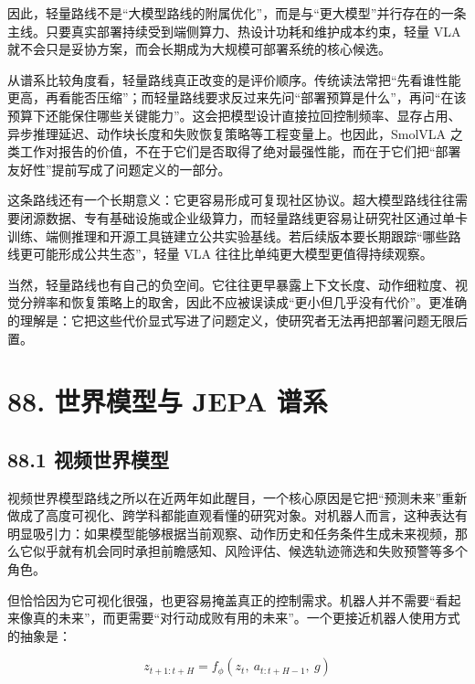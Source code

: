 因此，轻量路线不是“大模型路线的附属优化”，而是与“更大模型”并行存在的一条主线。只要真实部署持续受到端侧算力、热设计功耗和维护成本约束，轻量 VLA 就不会只是妥协方案，而会长期成为大规模可部署系统的核心候选。

从谱系比较角度看，轻量路线真正改变的是评价顺序。传统读法常把“先看谁性能更高，再看能否压缩”；而轻量路线要求反过来先问“部署预算是什么”，再问“在该预算下还能保住哪些关键能力”。这会把模型设计直接拉回控制频率、显存占用、异步推理延迟、动作块长度和失败恢复策略等工程变量上。也因此，SmolVLA 之类工作对报告的价值，不在于它们是否取得了绝对最强性能，而在于它们把“部署友好性”提前写成了问题定义的一部分。

这条路线还有一个长期意义：它更容易形成可复现社区协议。超大模型路线往往需要闭源数据、专有基础设施或企业级算力，而轻量路线更容易让研究社区通过单卡训练、端侧推理和开源工具链建立公共实验基线。若后续版本要长期跟踪“哪些路线更可能形成公共生态”，轻量 VLA 往往比单纯更大模型更值得持续观察。

当然，轻量路线也有自己的负空间。它往往更早暴露上下文长度、动作细粒度、视觉分辨率和恢复策略上的取舍，因此不应被误读成“更小但几乎没有代价”。更准确的理解是：它把这些代价显式写进了问题定义，使研究者无法再把部署问题无限后置。

\section*{88. 世界模型与 JEPA 谱系}

\subsection*{88.1 视频世界模型}


视频世界模型路线之所以在近两年如此醒目，一个核心原因是它把“预测未来”重新做成了高度可视化、跨学科都能直观看懂的研究对象。对机器人而言，这种表达有明显吸引力：如果模型能够根据当前观察、动作历史和任务条件生成未来视频，那么它似乎就有机会同时承担前瞻感知、风险评估、候选轨迹筛选和失败预警等多个角色。

但恰恰因为它可视化很强，也更容易掩盖真正的控制需求。机器人并不需要“看起来像真的未来”，而更需要“对行动成败有用的未来”。一个更接近机器人使用方式的抽象是：

\begin{equation*}
z_{t+1:t+H} = f_{\phi}(z_t,\ a_{t:t+H-1},\ g)
\end{equation*}

